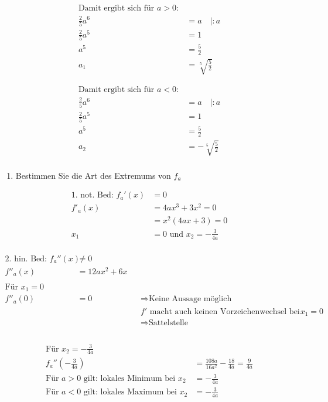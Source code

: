\documentclass[
  letterpaper,
  DIV=11,
  numbers=noendperiod]{scrartcl}
\providecommand{\tightlist}{%
  \setlength{\itemsep}{0pt}\setlength{\parskip}{0pt}}\usepackage{longtable,booktabs,array}
\begin{document}
\[
\begin{aligned}
\text{Damit ergibt sich für } a>0:\\
\frac{2}{5}a^6 &=a\quad |:a\\
\frac{2}{5}a^5 &= 1\\
a^5 &=\frac{5}{2}\\
a_1 &=\sqrt[5]{\frac{5}{2}} 
\end{aligned}
\]

\[
\begin{aligned}
\text{Damit ergibt sich für }a <0:\\
\frac{2}{5}a^6 &=a\quad |:a\\
\frac{2}{5}a^5 &= 1\\
a^5 &=\frac{5}{2}\\
a_2 &=-\sqrt[5]{\frac{5}{2}} \\
\end{aligned}
\]

\begin{enumerate}
\def\labelenumi{\arabic{enumi}.}
\setcounter{enumi}{2}
\tightlist
\item
  Bestimmen Sie die Art des Extremums von \(f_a\)
\end{enumerate}

\[
\begin{aligned}
\text{1. not. Bed: } f_a'(x) &=0\\
f'_a(x) &= 4ax^3+3x^2 = 0\\
&= x^2(4ax+3) = 0\\
x_1 &= 0 \text{ und } x_2 = -\frac{3}{4a}\\
\end{aligned}
\]

\[
\begin{aligned}
\text{2. hin. Bed: } f_a''(x) &\neq 0\\
f''_a(x) &= 12ax^2+6x\\\\
\text{Für }x_1= 0\\
f''_a(0) &= 0\quad && \Rightarrow  \text{Keine Aussage möglich}\\
& && f' \text{ macht auch keinen Vorzeichenwechsel bei } x_1=0\\
& && \Rightarrow  \text{Sattelstelle}\\\\
\end{aligned}
\]

\[
\begin{aligned}
\text{Für }x_2= -\frac{3}{4a}\\
f_a''\left(-\frac{3}{4a}\right) &= \frac{108a}{16a^2}-\frac{18}{4a} = \frac{9}{4a}\\
\text{Für } a>0 \text{ gilt: lokales Minimum bei } x_2 &=-\frac{3}{4a}\\
\text{Für } a<0 \text{ gilt: lokales Maximum bei } x_2 &=-\frac{3}{4a}\\
\end{aligned}
\]
\end{document}
